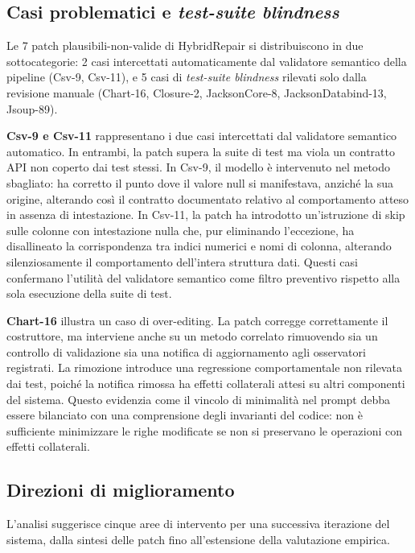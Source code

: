 \subsection{Casi problematici e \emph{test-suite blindness}}

Le 7 patch plausibili-non-valide di HybridRepair si distribuiscono in due sottocategorie:
2 casi intercettati automaticamente dal validatore semantico della pipeline (Csv-9, Csv-11),
e 5 casi di \emph{test-suite blindness} rilevati solo dalla revisione manuale
(Chart-16, Closure-2, JacksonCore-8, JacksonDatabind-13, Jsoup-89).

\textbf{Csv-9 e Csv-11} rappresentano i due casi intercettati dal validatore semantico
automatico. In entrambi, la patch supera la suite di test ma viola un contratto API
non coperto dai test stessi. In Csv-9, il modello è intervenuto nel metodo sbagliato:
ha corretto il punto dove il valore null si manifestava, anziché la sua origine,
alterando così il contratto documentato relativo al comportamento atteso in assenza di
intestazione. In Csv-11, la patch ha introdotto un'istruzione di skip sulle colonne
con intestazione nulla che, pur eliminando l'eccezione, ha disallineato la corrispondenza
tra indici numerici e nomi di colonna, alterando silenziosamente il comportamento
dell'intera struttura dati. Questi casi confermano l'utilità del validatore semantico
come filtro preventivo rispetto alla sola esecuzione della suite di test.

\textbf{Chart-16} illustra un caso di over-editing. La patch corregge correttamente
il costruttore, ma interviene anche su un metodo correlato rimuovendo sia un controllo
di validazione sia una notifica di aggiornamento agli osservatori registrati. La
rimozione introduce una regressione comportamentale non rilevata dai test, poiché
la notifica rimossa ha effetti collaterali attesi su altri componenti del sistema.
Questo evidenzia come il vincolo di minimalità nel prompt debba essere bilanciato con
una comprensione degli invarianti del codice: non è sufficiente minimizzare le righe
modificate se non si preservano le operazioni con effetti collaterali.

\subsection{Direzioni di miglioramento}
\label{subsec:direzioni-miglioramento}

L'analisi suggerisce cinque aree di intervento per una successiva iterazione del sistema, dalla
sintesi delle patch fino all'estensione della valutazione empirica.

